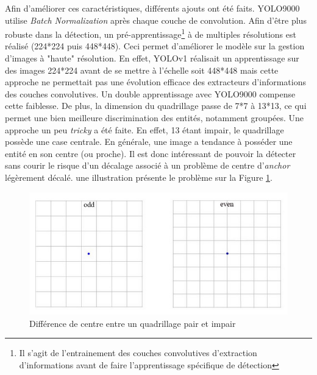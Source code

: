\noindent Afin d'améliorer ces caractéristiques, différents ajouts ont été faits. YOLO9000 utilise \textit{Batch Normalization} après chaque couche de convolution. Afin d'être plus robuste dans la détection, un pré-apprentissage\footnote{Il s'agit de l'entrainement des couches convolutives d'extraction d'informations avant de faire l'apprentissage spécifique de détection} à de multiples résolutions est réalisé (224*224 puis 448*448). Ceci permet d'améliorer le modèle sur la gestion d'images à "haute" résolution. En effet, YOLOv1 réalisait un apprentissage sur des images 224*224 avant de se mettre à l'échelle soit 448*448 mais cette approche ne permettait pas une évolution efficace des extracteurs d'informations des couches convolutives. Un double apprentissage avec YOLO9000 compense cette faiblesse. De plus, la dimension du quadrillage passe de 7*7 à 13*13, ce qui permet une bien meilleure discrimination des entités, notamment groupées. Une approche un peu \textit{tricky} a été faite. En effet, 13 étant impair, le quadrillage possède une case centrale. En générale, une image a tendance à posséder une entité en son centre (ou proche). Il est donc intéressant de pouvoir la détecter sans courir le risque d'un décalage associé à un problème de centre d'\textit{anchor} légèrement décalé. une illustration présente le problème sur la Figure \ref{yolov2odd}.\\

\begin{figure}
\centering
\includegraphics[scale=0.4]{./tex/computer-vision/sota/odd.png}
\caption{Différence de centre entre un quadrillage pair et impair}
\label{yolov2odd}
\end{figure}

